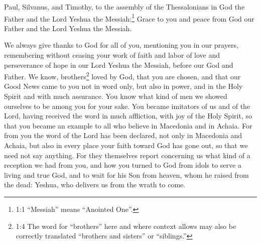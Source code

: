 






\vspace{-1.36in}

\mychapter{} \myverse*{}Paul, Silvanus, and Timothy, to the assembly of the Thessalonians
in God the Father and the Lord Yeshua the Messiah:\footnote{1:1 “Messiah” means “Anointed One”.} Grace to you and peace from God our Father and the Lord
Yeshua the Messiah.

\myverse{}We always give thanks to God for all of you, mentioning you in
our prayers,
\myverse{}remembering without ceasing your work of faith and labor of love and perseverance
of hope in our Lord Yeshua the Messiah, before our God and Father.
\myverse{}We know, brothers\footnote{1:4 The word for “brothers” here and where context allows may also be correctly translated “brothers
	and sisters” or “siblings.”
} loved by God, that you are chosen,
\myverse{}and that our Good News came to you not in word only, but also in power, and
in the Holy Spirit and with much assurance. You know what kind of men we showed ourselves to be among
you for your sake.
\myverse{}You became imitators of us and of the Lord, having received the word in much
affliction, with joy of the Holy Spirit,
\myverse{}so that you became an example to all who believe in Macedonia and in Achaia.
\myverse{}For from you the word of the Lord has been declared, not only in Macedonia and
Achaia, but also in every place your faith toward God has gone out, so that we need not say anything.
\myverse{}For they themselves report concerning us what kind of a reception we had from
you, and how you turned to God from idols to serve a living and true God,
\myverse{}and to wait for his Son from heaven, whom he raised from the dead: Yeshua,
who delivers us from the wrath to come.


